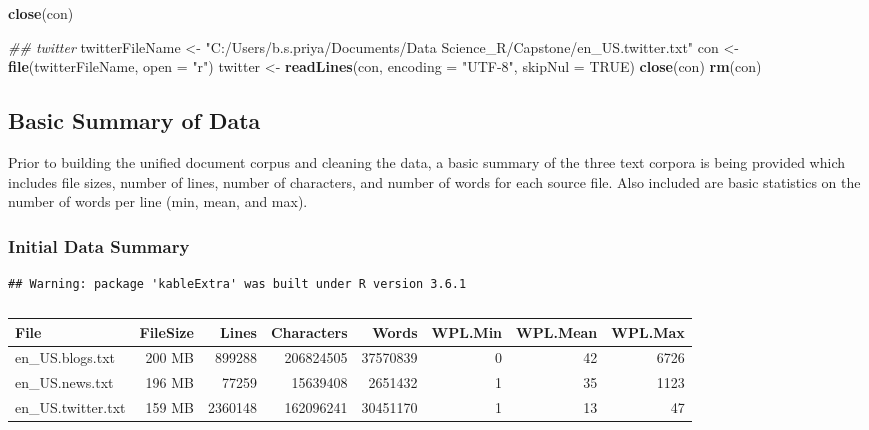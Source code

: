 \documentclass[]{article}
\newenvironment{Shaded}{\begin{snugshade}}{\end{snugshade}}
\newcommand{\CommentTok}[1]{\textcolor[rgb]{0.56,0.35,0.01}{\textit{#1}}}
\newcommand{\DataTypeTok}[1]{\textcolor[rgb]{0.13,0.29,0.53}{#1}}
\newcommand{\KeywordTok}[1]{\textcolor[rgb]{0.13,0.29,0.53}{\textbf{#1}}}
\newcommand{\NormalTok}[1]{#1}
\newcommand{\OtherTok}[1]{\textcolor[rgb]{0.56,0.35,0.01}{#1}}
\newcommand{\StringTok}[1]{\textcolor[rgb]{0.31,0.60,0.02}{#1}}
\begin{document}
\begin{Shaded}
\begin{Highlighting}[]
\KeywordTok{close}\NormalTok{(con)}

\CommentTok{## twitter}
\NormalTok{twitterFileName <-}\StringTok{ "C:/Users/b.s.priya/Documents/Data Science_R/Capstone/en_US.twitter.txt"}
\NormalTok{con <-}\StringTok{ }\KeywordTok{file}\NormalTok{(twitterFileName, }\DataTypeTok{open =} \StringTok{"r"}\NormalTok{)}
\NormalTok{twitter <-}\StringTok{ }\KeywordTok{readLines}\NormalTok{(con, }\DataTypeTok{encoding =} \StringTok{"UTF-8"}\NormalTok{, }\DataTypeTok{skipNul =} \OtherTok{TRUE}\NormalTok{)}
\KeywordTok{close}\NormalTok{(con)}
\KeywordTok{rm}\NormalTok{(con)}
\end{Highlighting}
\end{Shaded}

\hypertarget{basic-summary-of-data}{%
\subsection{Basic Summary of Data}\label{basic-summary-of-data}}

Prior to building the unified document corpus and cleaning the data, a
basic summary of the three text corpora is being provided which includes
file sizes, number of lines, number of characters, and number of words
for each source file. Also included are basic statistics on the number
of words per line (min, mean, and max).

\hypertarget{initial-data-summary}{%
\subsubsection{Initial Data Summary}\label{initial-data-summary}}

\begin{verbatim}
## Warning: package 'kableExtra' was built under R version 3.6.1
\end{verbatim}

\begin{table}[t]

\caption{\label{tab:initial-data-summary-table}}
\begin{tabular}{l|r|r|r|r|r|r|r}
\hline
File & FileSize & Lines & Characters & Words & WPL.Min & WPL.Mean & WPL.Max\\
\hline
en\_US.blogs.txt & 200  MB & 899288 & 206824505 & 37570839 & 0 & 42 & 6726\\
\hline
en\_US.news.txt & 196  MB & 77259 & 15639408 & 2651432 & 1 & 35 & 1123\\
\hline
en\_US.twitter.txt & 159  MB & 2360148 & 162096241 & 30451170 & 1 & 13 & 47\\
\hline
\end{tabular}
\end{table}
\end{document}
